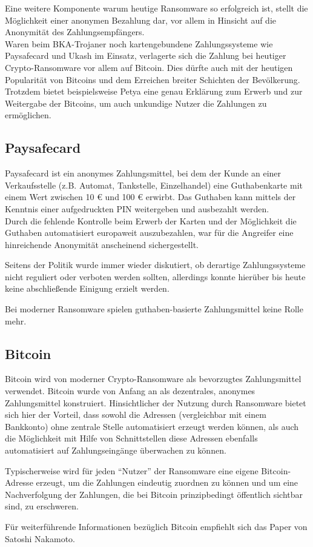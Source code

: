 Eine weitere Komponente warum heutige Ransomware so erfolgreich ist, stellt die Möglichkeit einer anonymen Bezahlung dar, vor allem in Hinsicht auf die Anonymität des Zahlungsempfängers. \\
Waren beim BKA-Trojaner noch kartengebundene Zahlungssysteme wie Paysafecard und Ukash im Einsatz, verlagerte sich die Zahlung bei heutiger Crypto-Ransomware vor allem auf Bitcoin. Dies dürfte auch mit der heutigen Popularität von Bitcoins und dem Erreichen breiter Schichten der Bevölkerung. Trotzdem bietet beispielsweise Petya eine genau Erklärung zum Erwerb und zur Weitergabe der Bitcoins, um auch unkundige Nutzer die Zahlungen zu ermöglichen. \cite{petya:infect}

\subsection{Paysafecard}
Paysafecard ist ein anonymes Zahlungsmittel, bei dem der Kunde an einer Verkaufsstelle (z.B. Automat, Tankstelle, Einzelhandel) eine Guthabenkarte mit einem Wert zwischen 10 € und 100 € erwirbt. Das Guthaben kann mittels der Kenntnis einer aufgedruckten PIN weitergeben und ausbezahlt werden. \\
Durch die fehlende Kontrolle beim Erwerb der Karten und der Möglichkeit die Guthaben automatisiert europaweit auszubezahlen, war für die Angreifer eine hinreichende Anonymität anscheinend sichergestellt. 

Seitens der Politik wurde immer wieder diskutiert, ob derartige Zahlungssysteme nicht reguliert oder verboten werden sollten, allerdings konnte hierüber bis heute keine abschließende Einigung erzielt werden. \cite{paysafecard}

Bei moderner Ransomware spielen guthaben-basierte Zahlungsmittel keine Rolle mehr.

\subsection{Bitcoin}
Bitcoin wird von moderner Crypto-Ransomware als bevorzugtes Zahlungsmittel verwendet. Bitcoin wurde von Anfang an als dezentrales, anonymes Zahlungsmittel konstruiert. Hinsichtlicher der Nutzung durch Ransomware bietet sich hier der Vorteil, dass sowohl die Adressen (vergleichbar mit einem Bankkonto) ohne zentrale Stelle automatisiert erzeugt werden können, als auch die Möglichkeit mit Hilfe von Schnittstellen diese Adressen ebenfalls automatisiert auf Zahlungseingänge überwachen zu können. 

Typischerweise wird für jeden "`Nutzer"' der Ransomware eine eigene Bitcoin-Adresse erzeugt, um die Zahlungen eindeutig zuordnen zu können und um eine Nachverfolgung der Zahlungen, die bei Bitcoin prinzipbedingt öffentlich sichtbar sind, zu erschweren. 

Für weiterführende Informationen bezüglich Bitcoin empfiehlt sich das Paper von Satoshi Nakamoto. \cite{bitcoin}
